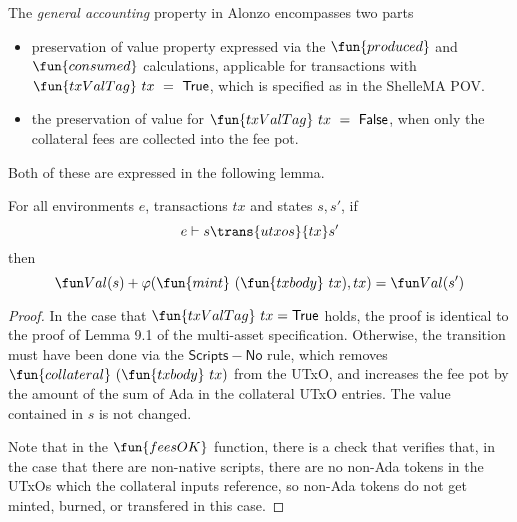 \begin{property}
  \label{prop:pov}
  The \emph{general accounting} property in Alonzo encompasses two parts
  \begin{itemize}
    \item preservation of value property expressed via the $\fun{produced}$ and $\fun{consumed}$
    calculations, applicable for transactions with $\fun{txValTag}~tx~=~\True$, which
    is specified as in the ShelleMA POV.
    \item the preservation of value for $\fun{txValTag}~tx~=~\False$, when
    only the collateral fees are collected into the fee pot.
  \end{itemize}

Both of these are expressed in the following lemma.

\begin{lemma}
  For all environments $e$, transactions $tx$ and states $s, s'$, if
  \begin{equation*}
    e\vdash s\trans{utxos}{tx}s'
  \end{equation*}
  then
  \begin{equation*}
    \Val(s) + \varphi(\fun{mint}~(\fun{txbody}~tx), tx) = \Val(s')
  \end{equation*}
\end{lemma}

\begin{proof}
  In the case that $\fun{txValTag}~tx = \True$ holds, the proof is
  identical to the proof of Lemma 9.1 of the multi-asset
  specification. Otherwise, the transition must have been done via the
  $\mathsf{Scripts-No}$ rule, which removes
  $\fun{collateral}~(\fun{txbody}~tx)$ from the UTxO, and increases the fee pot by the amount of the sum of Ada in the
  collateral UTxO entries. The value contained in $s$ is not changed.

  Note that in the $\fun{feesOK}$ function, there is a check that verifies
  that, in the case that there are non-native scripts, there are no non-Ada tokens in the UTxOs
  which the collateral inputs reference, so non-Ada tokens do not get minted, burned, or transfered
  in this case.
\end{proof}
\end{property}

